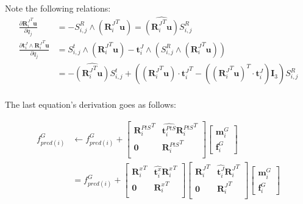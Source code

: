 Note the following relations:
\begin{align}
  \frac{\partial {\mathbf{R}_i^J}^T \mathbf{u}}{\partial q_j}
  &= - S^R_{i,j} \wedge ({\mathbf{R}_i^J}^T \mathbf{u})
  = \widehat{({\mathbf{R}_i^J}^T \mathbf{u})} S^R_{i,j}
  \\
  \frac{\partial\mathbf{t}^J_i\wedge {\mathbf{R}_i^J}^T  \mathbf{u}}{\partial q_j}
  &= S^t_{i,j} \wedge \left({\mathbf{R}_i^J}^T \mathbf{u}\right)
  - \mathbf{t}^J_i \wedge \left( S^R_{i,j} \wedge \left({\mathbf{R}_i^J}^T \mathbf{u}\right)\right) \\
  &= -\widehat{({\mathbf{R}_i^J}^T \mathbf{u})} S^t_{i,j}
  + \left(\left({\mathbf{R}_i^J}^T \mathbf{u}\right) \cdot {\mathbf{t}^J_i}^T
  - \left( {({\mathbf{R}_i^J}^T \mathbf{u})}^T \cdot \mathbf{t}^J_i\right) \mathbf{I}_3\right)S_{i,j}^R\\
\end{align}

The last equation's derivation goes as follows:

\begin{align}
  f^G_{pred(i)} & \leftarrow f^G_{pred(i)} +
  \begin{bmatrix}
    {\mathbf{R}^{PtS}_i}^T & \widehat{\mathbf{t}^{PtS}_i}{\mathbf{R}^{PtS}_i}^T \\
    \mathbf{0} & {\mathbf{R}^{PtS}_i}^T \\
  \end{bmatrix}
  \begin{bmatrix}
    \mathbf{m}^{G}_i \\ \mathbf{f}^{G}_i
  \end{bmatrix}
  \\
  & =f^G_{pred(i)} + \begin{bmatrix}
    {\mathbf{R}^{x}_i}^T & \widehat{\mathbf{t}^{x}_i}{\mathbf{R}^{x}_i}^T \\
    \mathbf{0} & {\mathbf{R}^{x}_i}^T \\
  \end{bmatrix}
  \begin{bmatrix}
    {\mathbf{R}^{J}_i}^T & \widehat{\mathbf{t}^{J}_i}{\mathbf{R}^{J}_i}^T \\
    \mathbf{0} & {\mathbf{R}^{J}_i}^T \\
  \end{bmatrix}
  \begin{bmatrix}
    \mathbf{m}^{G}_i \\ \mathbf{f}^{G}_i
  \end{bmatrix}
  \\
\end{align}

